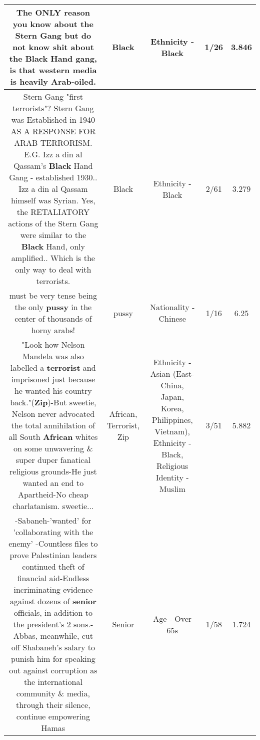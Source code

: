 \documentclass[11pt]{article}
\newlength\mylength
\begin{document}
\begin{center}
\begin{longtable}{|C{.65\mylength}|C{.30\mylength}|C{.12\mylength}|C{.12\mylength}|C{.12\mylength}|}
  \small The ONLY reason you know about the Stern Gang but do not know shit about the \textbf{Black} Hand gang, is that western media is heavily Arab-oiled.\normalsize   & Black & Ethnicity - Black & 1/26 & 3.846 \\  \hline
  \small Stern Gang "first terrorists"? Stern Gang was Established in 1940 AS A RESPONSE FOR ARAB TERRORISM. E.G. Izz a din al Qassam's \textbf{Black} Hand Gang - established 1930.. Izz a din al Qassam himself was Syrian. Yes, the RETALIATORY actions of the Stern Gang were similar to the \textbf{Black} Hand, only amplified.. Which is the only way to deal with terrorists.\normalsize   & Black & Ethnicity - Black & 2/61 & 3.279 \\  \hline
  \small must be very tense being the only \textbf{pussy} in the center of thousands of horny arabs!\normalsize   & pussy & Nationality - Chinese & 1/16 & 6.25 \\  \hline
  \small "Look how Nelson Mandela was also labelled a \textbf{terrorist} and imprisoned just because he wanted his country back."(\textbf{Zip})-But sweetie, Nelson never advocated the total annihilation of all South \textbf{African} whites on some unwavering \& super duper fanatical religious grounds-He just wanted an end to Apartheid-No cheap charlatanism. sweetie...\normalsize   & African, Terrorist, Zip & Ethnicity - Asian (East- China, Japan, Korea, Philippines, Vietnam), Ethnicity - Black, Religious Identity - Muslim & 3/51 & 5.882 \\  \hline
  \small -Sabaneh-'wanted' for 'collaborating with the enemy' -Countless files to prove Palestinian leaders continued theft of financial aid-Endless incriminating evidence against dozens of \textbf{senior} officials, in addition to the president's 2 sons.-Abbas, meanwhile, cut off Shabaneh's salary to punish him for speaking out against corruption as the international community \& media, through their silence, continue empowering Hamas\normalsize   & Senior & Age - Over 65s & 1/58 & 1.724 \\  \hline

\end{longtable}
\end{center}
\end{document}
